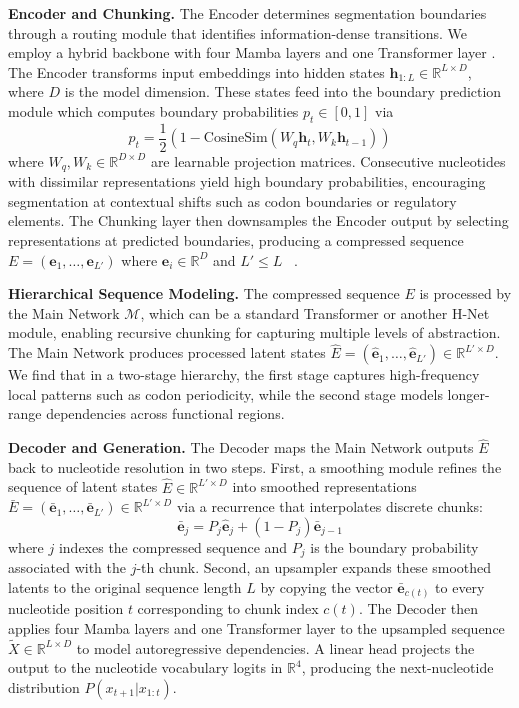 \documentclass{article}
\theoremstyle{plain}
\theoremstyle{definition}
\theoremstyle{remark}
\begin{document}
\textbf{Encoder and Chunking.}
The Encoder determines segmentation boundaries through a routing module that identifies information-dense transitions. We employ a hybrid backbone with four Mamba layers \citep{gu2024mambalineartimesequencemodeling} and one Transformer layer \citep{vaswani2023attentionneed}. The Encoder transforms input embeddings into hidden states $\mathbf{h}_{1:L} \in \mathbb{R}^{L \times D}$, where $D$ is the model dimension. These states feed into the boundary prediction module which computes boundary probabilities $p_t \in [0, 1]$ via
\begin{equation}
    p_t = \frac{1}{2}\left(1 - \text{CosineSim}(W_q \mathbf{h}_t, W_k \mathbf{h}_{t-1})\right)
\end{equation}
where $W_q, W_k \in \mathbb{R}^{D \times D}$ are learnable projection matrices. Consecutive nucleotides with dissimilar representations yield high boundary probabilities, encouraging segmentation at contextual shifts such as codon boundaries or regulatory elements. The Chunking layer then downsamples the Encoder output by selecting representations at predicted boundaries, producing a compressed sequence $E = (\mathbf{e}_1, \dots, \mathbf{e}_{L'})$ where $\mathbf{e}_i \in \mathbb{R}^{D}$ and $L' \le L$ ~\citep{hwang2025dynamicchunkingendtoendhierarchical}.

\textbf{Hierarchical Sequence Modeling.}
The compressed sequence $E$ is processed by the Main Network $\mathcal{M}$, which can be a standard Transformer or another H-Net module, enabling recursive chunking for capturing multiple levels of abstraction. The Main Network produces processed latent states $\hat{E} = (\mathbf{\hat{e}}_1, \dots, \mathbf{\hat{e}}_{L'}) \in \mathbb{R}^{L' \times D}$. We find that in a two-stage hierarchy, the first stage captures high-frequency local patterns such as codon periodicity, while the second stage models longer-range dependencies across functional regions.

\textbf{Decoder and Generation.}
The Decoder maps the Main Network outputs $\hat{E}$ back to nucleotide resolution in two steps. First, a smoothing module refines the sequence of latent states $\hat{E} \in \mathbb{R}^{L' \times D}$ into smoothed representations $\bar{E} = (\mathbf{\bar{e}}_1, \dots, \mathbf{\bar{e}}_{L'}) \in \mathbb{R}^{L' \times D}$ via a recurrence that interpolates discrete chunks:
\begin{equation}
    \mathbf{\bar{e}}_j = P_j \mathbf{\hat{e}}_j + (1 - P_j) \mathbf{\bar{e}}_{j-1}
\end{equation}
where $j$ indexes the compressed sequence and $P_j$ is the boundary probability associated with the $j$-th chunk. Second, an upsampler expands these smoothed latents to the original sequence length $L$ by copying the vector $\mathbf{\bar{e}}_{c(t)}$ to every nucleotide position $t$ corresponding to chunk index $c(t)$. The Decoder then applies four Mamba layers and one Transformer layer to the upsampled sequence $\tilde{X} \in \mathbb{R}^{L \times D}$ to model autoregressive dependencies. A linear head projects the output to the nucleotide vocabulary logits in $\mathbb{R}^{4}$, producing the next-nucleotide distribution $P(x_{t+1} | x_{1:t})$.
\end{document}
